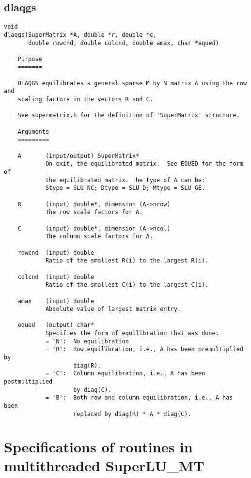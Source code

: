\section{dlaqgs}
\begin{verbatim}
void
dlaqgs(SuperMatrix *A, double *r, double *c, 
       double rowcnd, double colcnd, double amax, char *equed)

    Purpose   
    =======   

    DLAQGS equilibrates a general sparse M by N matrix A using the row and   
    scaling factors in the vectors R and C.   

    See supermatrix.h for the definition of 'SuperMatrix' structure.

    Arguments   
    =========   

    A       (input/output) SuperMatrix*
            On exit, the equilibrated matrix.  See EQUED for the form of 
            the equilibrated matrix. The type of A can be:
            Stype = SLU_NC; Dtype = SLU_D; Mtype = SLU_GE.
	    
    R       (input) double*, dimension (A->nrow)
            The row scale factors for A.
	    
    C       (input) double*, dimension (A->ncol)
            The column scale factors for A.
	    
    rowcnd  (input) double
            Ratio of the smallest R(i) to the largest R(i).
	    
    colcnd  (input) double
            Ratio of the smallest C(i) to the largest C(i).
	    
    amax    (input) double
            Absolute value of largest matrix entry.
	    
    equed   (output) char*
            Specifies the form of equilibration that was done.   
            = 'N':  No equilibration   
            = 'R':  Row equilibration, i.e., A has been premultiplied by  
                    diag(R).   
            = 'C':  Column equilibration, i.e., A has been postmultiplied  
                    by diag(C).   
            = 'B':  Both row and column equilibration, i.e., A has been
                    replaced by diag(R) * A * diag(C).   

\end{verbatim}


\chapter{Specifications of routines in multithreaded SuperLU\_MT}
\label{chap:superlu_mt_spec}

